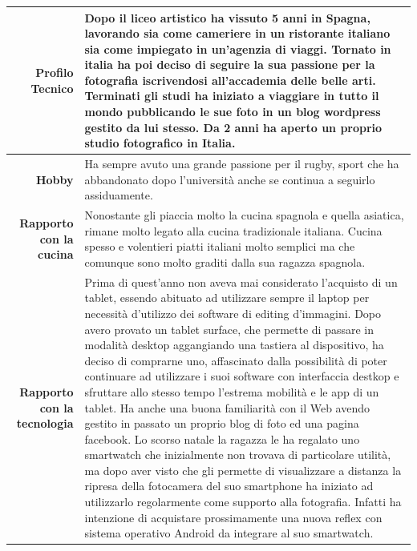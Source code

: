 \begin{table}[H]
\begin{centering}
\begin{tabular} { | r  p{10cm} | }
\hline
		\textbf{Profilo Tecnico} & Dopo il liceo artistico ha vissuto 5
anni in Spagna, lavorando sia come cameriere in un ristorante italiano
sia come impiegato in un'agenzia di viaggi. Tornato in italia ha poi
deciso di seguire la sua passione per la fotografia iscrivendosi
all'accademia delle belle arti. Terminati gli studi ha iniziato a
viaggiare in tutto il mondo pubblicando le sue foto in un blog wordpress gestito
da lui stesso. Da 2 anni ha aperto un proprio studio fotografico in
Italia. \\ \hline
		\textbf{Hobby} & Ha sempre avuto una grande passione per il
rugby, sport che ha abbandonato dopo l'università anche se continua a
seguirlo assiduamente. \\ \hline
		\textbf{Rapporto con la cucina} & Nonostante gli piaccia molto
la cucina spagnola e quella asiatica, rimane molto legato alla cucina
tradizionale italiana. Cucina spesso e volentieri piatti italiani molto
semplici ma che comunque sono molto graditi dalla sua ragazza spagnola.
\\ \hline
		\textbf{Rapporto con la tecnologia} & Prima di quest'anno non
aveva mai considerato
l'acquisto di un tablet, essendo abituato ad utilizzare sempre il laptop 
per necessità d'utilizzo dei software di editing
d'immagini. Dopo avero provato un tablet surface, che permette di
passare in modalità desktop aggangiando una tastiera al dispositivo, ha
deciso di comprarne uno, affascinato dalla possibilità di poter
continuare ad utilizzare i suoi software con interfaccia destkop e
sfruttare allo stesso tempo l'estrema mobilità e le app di un tablet.
Ha anche una buona familiarità con il Web avendo gestito in passato un proprio
blog di foto ed una pagina facebook. Lo scorso natale la ragazza le ha
regalato uno smartwatch che inizialmente non trovava di particolare
utilità, ma dopo aver visto che gli permette di visualizzare a distanza
la ripresa della fotocamera del suo smartphone ha iniziato ad
utilizzarlo regolarmente come supporto alla fotografia. Infatti ha
intenzione di acquistare prossimamente una nuova reflex con sistema
operativo Android da integrare al suo smartwatch.
\\ \hline
	\end{tabular}
	\end{centering}
\end{table}


